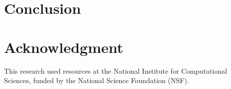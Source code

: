 \documentclass[10pt, conference, compsocconf]{IEEEtran}
\begin{document}
\section{Conclusion}
\label{sec:conclusion}

\section*{Acknowledgment}
This research used resources at the National Institute for Computational Sciences, funded by the National Science Foundation (NSF).

\IEEEtriggercmd{\enlargethispage{-2in}}


%
%
%


%
%
%


\end{document}
